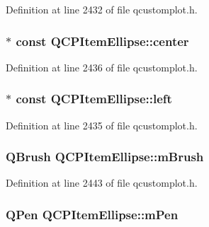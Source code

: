 Definition at line 2432 of file qcustomplot.\-h.

\hypertarget{class_q_c_p_item_ellipse_a8b6dd0e854f99239c5806ffdf2f590b3}{
\subsubsection[{center}]{$\ast$ const Q\-C\-P\-Item\-Ellipse\-::center}}\label{class_q_c_p_item_ellipse_a8b6dd0e854f99239c5806ffdf2f590b3}


Definition at line 2436 of file qcustomplot.\-h.

\hypertarget{class_q_c_p_item_ellipse_aa259cd03efaedf60cf5b1019b20e4f2b}{
\subsubsection[{left}]{$\ast$ const Q\-C\-P\-Item\-Ellipse\-::left}}\label{class_q_c_p_item_ellipse_aa259cd03efaedf60cf5b1019b20e4f2b}


Definition at line 2435 of file qcustomplot.\-h.

\hypertarget{class_q_c_p_item_ellipse_a6fa59478cd3ad1b10e6c1f6cedc84bd6}{
\subsubsection[{m\-Brush}]{\setlength{\rightskip}{0pt plus 5cm}Q\-Brush Q\-C\-P\-Item\-Ellipse\-::m\-Brush\hspace{0.3cm}{\ttfamily [protected]}}}\label{class_q_c_p_item_ellipse_a6fa59478cd3ad1b10e6c1f6cedc84bd6}


Definition at line 2443 of file qcustomplot.\-h.

\hypertarget{class_q_c_p_item_ellipse_a16ad9389acf028a7e4ac8fd7a550b2e4}{
\subsubsection[{m\-Pen}]{\setlength{\rightskip}{0pt plus 5cm}Q\-Pen Q\-C\-P\-Item\-Ellipse\-::m\-Pen\hspace{0.3cm}{\ttfamily [protected]}}}\label{class_q_c_p_item_ellipse_a16ad9389acf028a7e4ac8fd7a550b2e4}


